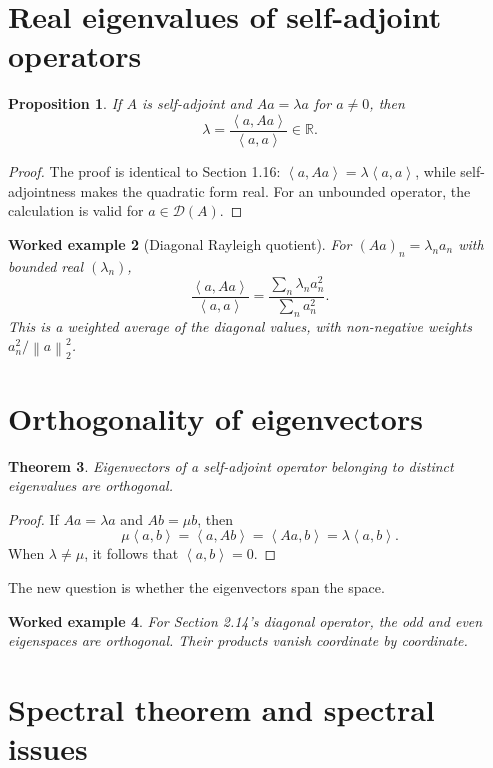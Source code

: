 \documentclass[11pt,a5paper,oneside,openany]{scrreprt}
\theoremstyle{notes}
\newtheorem{theorem}{Theorem}[section]
\newtheorem{proposition}[theorem]{Proposition}
\theoremstyle{definitions}
\newtheorem{example}[theorem]{Worked example}
\newcommand{\R}{\mathbb{R}}
\newcommand{\ip}[2]{\left\langle #1,#2\right\rangle}
\newcommand{\norm}[1]{\left\lVert #1\right\rVert}
\begin{document}
\section{Real eigenvalues of self-adjoint operators}

\begin{proposition}
If $A$ is self-adjoint and $Aa=\lambda a$ for $a\ne0$, then
\[
 \lambda=\frac{\ip{a}{Aa}}{\ip{a}{a}}\in\R.
\]
\end{proposition}

\begin{proof}
The proof is identical to Section 1.16:
$\ip{a}{Aa}=\lambda\ip{a}{a}$, while self-adjointness makes the quadratic
form real.  For an unbounded operator, the calculation is valid for
$a\in\mathcal D(A)$.
\end{proof}

\begin{example}[Diagonal Rayleigh quotient]
For $(Aa)_n=\lambda_na_n$ with bounded real $(\lambda_n)$,
\[
 \frac{\ip{a}{Aa}}{\ip{a}{a}}
 =\frac{\sum_n\lambda_na_n^2}{\sum_na_n^2}.
\]
This is a weighted average of the diagonal values, with non-negative weights
$a_n^2/\norm{a}_2^2$.
\end{example}

\section{Orthogonality of eigenvectors}

\begin{theorem}
Eigenvectors of a self-adjoint operator belonging to distinct eigenvalues are
orthogonal.
\end{theorem}

\begin{proof}
If $Aa=\lambda a$ and $Ab=\mu b$, then
\[
 \mu\ip{a}{b}=\ip{a}{Ab}=\ip{Aa}{b}=\lambda\ip{a}{b}.
\]
When $\lambda\ne\mu$, it follows that $\ip{a}{b}=0$.
\end{proof}

The new question is whether the eigenvectors span the space.

\begin{example}
For Section 2.14's diagonal operator, the odd and even eigenspaces are
orthogonal.  Their products vanish coordinate by coordinate.
\end{example}

\section{Spectral theorem and spectral issues}
\end{document}
